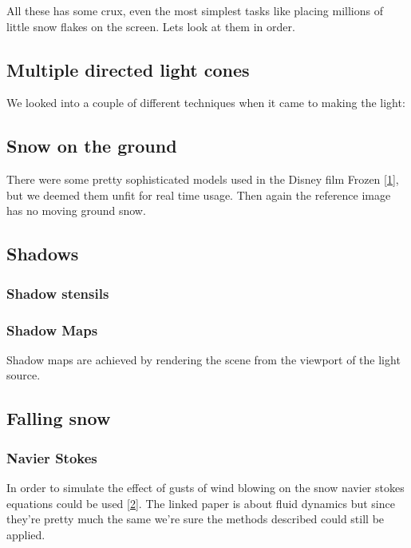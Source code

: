 \documentclass[a4paper,12pt]{article}
\begin{document}
All these has some crux, even the most simplest tasks like placing millions of little snow flakes on the screen. Lets look at them in order.


\subsection{Multiple directed light cones}

We looked into a couple of different techniques when it came to making the light:


\subsection{Snow on the ground}

There were some pretty sophisticated models used in the Disney film Frozen \href{https://disney-animation.s3.amazonaws.com/uploads/production/publication_asset/94/asset/SSCTS13_2.pdf}{[1]}, but we deemed them unfit for real time usage. Then again the reference image has no moving ground snow.


\subsection{Shadows}


\subsubsection{Shadow stensils}

\subsubsection{Shadow Maps}

Shadow maps are achieved by rendering the scene from the viewport of the light source.


\subsection{Falling snow}

\subsubsection{Navier Stokes}

In order to simulate the effect of gusts of wind blowing on the snow navier stokes equations could be used \href{http://www.intpowertechcorp.com/GDC03.pdf}{[2]}. The linked paper is about fluid dynamics but since they're pretty much the same we're sure the methods described could still be applied.
\end{document}
